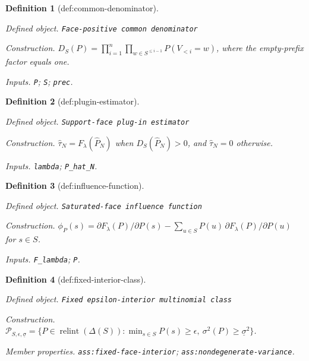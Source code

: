 \documentclass{article}
\newtheorem{definition}{Definition}
\begin{document}
\begin{definition}[def:common-denominator]\label{def:common-denominator}
\par\smallskip\noindent\emph{Defined object.} \texttt{Face-\allowbreak{}positive common denominator}
\par\smallskip\noindent\emph{Construction.} \(D_S(P)=\prod_{i=1}^n\prod_{w\in S^{\le i-1}}P(V_{<i}=w)\), where the empty-prefix factor equals one.
\par\smallskip\noindent\emph{Inputs.} \texttt{P}; \texttt{S}; \texttt{prec}.
\end{definition}

\begin{definition}[def:plugin-estimator]\label{def:plugin-estimator}
\par\smallskip\noindent\emph{Defined object.} \texttt{Support-\allowbreak{}face plug-\allowbreak{}in estimator}
\par\smallskip\noindent\emph{Construction.} \(\widehat\tau_N=F_{\lambda}(\widehat P_N)\) when \(D_S(\widehat P_N)>0\), and \(\widehat\tau_N=0\) otherwise.
\par\smallskip\noindent\emph{Inputs.} \texttt{lambda}; \texttt{P\_\allowbreak{}hat\_\allowbreak{}N}.
\end{definition}

\begin{definition}[def:influence-function]\label{def:influence-function}
\par\smallskip\noindent\emph{Defined object.} \texttt{Saturated-\allowbreak{}face influence function}
\par\smallskip\noindent\emph{Construction.} \(\phi_P(s)=\partial F_{\lambda}(P)/\partial P(s)-\sum_{u\in S}P(u)\,\partial F_{\lambda}(P)/\partial P(u)\) for \(s\in S\).
\par\smallskip\noindent\emph{Inputs.} \texttt{F\_\allowbreak{}lambda}; \texttt{P}.
\end{definition}

\begin{definition}[def:fixed-interior-class]\label{def:fixed-interior-class}
\par\smallskip\noindent\emph{Defined object.} \texttt{Fixed epsilon-\allowbreak{}interior multinomial class}
\par\smallskip\noindent\emph{Construction.} \(\mathcal P_{S,\epsilon,\underline\sigma}=\{P\in\operatorname{relint}(\Delta(S)):\min_{s\in S}P(s)\ge\epsilon,\ \sigma^2(P)\ge\underline\sigma^2\}\).
\par\smallskip\noindent\emph{Member properties.} \texttt{ass:\allowbreak{}fixed-\allowbreak{}face-\allowbreak{}interior}; \texttt{ass:\allowbreak{}nondegenerate-\allowbreak{}variance}.
\end{definition}
\end{document}
